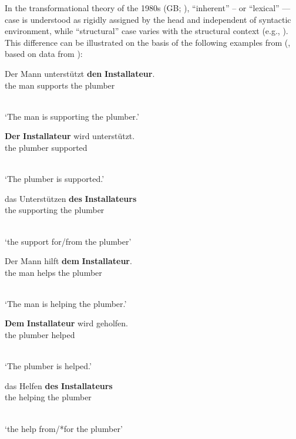 \documentclass[output=paper]{langsci/langscibook}
\begin{document}
In the transformational  theory of the 1980s (GB; \citealt{chom:81,chom:86a}), “inherent” – or “lexical” — case is understood as rigidly assigned by the head and independent of syntactic environment, while “structural” case varies with the structural context (e.g., \citealt[70]{Haider85b-ohne-crossref}).  This difference can be illustrated on the basis of the following examples from  (\citealt[63]{Prze99b}, based on data from \citealt{HM94a}):
\begin{examples} 
\item \label{ex:unterstutzen}
  \begin{examples}
  \item
    \begin{gloss}     
      Der Mann unterst\"utzt \textbf{den} \textbf{Installateur}. \\ 
      the man\Nom{} supports the plumber\Acc{}
    \end{gloss}\\[\glosslen]
    `The man is supporting the plumber.'
  \item 
    \begin{gloss}
      \textbf{Der} \textbf{Installateur} wird unterst\"utzt. \\
      the plumber\Nom{} \Aux{} supported
    \end{gloss}\\[\glosslen]
    `The plumber is supported.'
  \item
    \begin{gloss}     
      das Unterst\"utzen \textbf{des} \textbf{Installateurs} \\
      the supporting the plumber\Gen{}
    \end{gloss}\\[\glosslen]
    `the support for/from the plumber'
  \end{examples}
\item \label{ex:helfen}
  \begin{examples}
  \item 
    \begin{gloss}
      Der Mann hilft \textbf{dem} \textbf{Installateur}. \\
      the man\Nom{} helps the plumber\Dat{}
    \end{gloss}\\[\glosslen]
    `The man is helping the plumber.'
  \item 
    \begin{gloss}
      \textbf{Dem} \textbf{Installateur} wird geholfen. \\
      the plumber\Dat{} \Aux{} helped
    \end{gloss}\\[\glosslen]
    `The plumber is helped.'
  \item
    \begin{gloss}
      das Helfen \textbf{des} \textbf{Installateurs} \\
      the helping the plumber\Gen{}
    \end{gloss}\\[\glosslen]
    `the help from/*for the plumber'
  \end{examples}
\end{examples}
\end{document}
